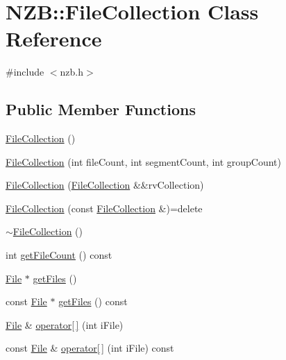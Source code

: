 \hypertarget{class_n_z_b_1_1_file_collection}{}\section{N\+ZB\+:\+:File\+Collection Class Reference}
\label{class_n_z_b_1_1_file_collection}


{\ttfamily \#include $<$nzb.\+h$>$}

\subsection*{Public Member Functions}
\begin{DoxyCompactItemize}
\item 
\hyperlink{class_n_z_b_1_1_file_collection_a2ae200e24e6a4ee4d1be8e649f72aba9}{File\+Collection} ()
\item 
\hyperlink{class_n_z_b_1_1_file_collection_a76662806b20ecb79fb1c4800df2ee9df}{File\+Collection} (int file\+Count, int segment\+Count, int group\+Count)
\item 
\hyperlink{class_n_z_b_1_1_file_collection_ab14971382a51c26233307404bacfa8e6}{File\+Collection} (\hyperlink{class_n_z_b_1_1_file_collection}{File\+Collection} \&\&rv\+Collection)
\item 
\hyperlink{class_n_z_b_1_1_file_collection_a1eeded48503a89ccc75e7446df3f7e3f}{File\+Collection} (const \hyperlink{class_n_z_b_1_1_file_collection}{File\+Collection} \&)=delete
\item 
\hyperlink{class_n_z_b_1_1_file_collection_a6d6986c488c8124efea37ef187589b88}{$\sim$\+File\+Collection} ()
\item 
int \hyperlink{class_n_z_b_1_1_file_collection_a33c0008fc18310d0a89fd72c38586c9a}{get\+File\+Count} () const
\item 
\hyperlink{class_n_z_b_1_1_file}{File} $\ast$ \hyperlink{class_n_z_b_1_1_file_collection_a921a80a0f09e9bd067566e236e5c688a}{get\+Files} ()
\item 
const \hyperlink{class_n_z_b_1_1_file}{File} $\ast$ \hyperlink{class_n_z_b_1_1_file_collection_a8b13dca0410b84a05aaeabe7e819b8cd}{get\+Files} () const
\item 
\hyperlink{class_n_z_b_1_1_file}{File} \& \hyperlink{class_n_z_b_1_1_file_collection_a60d75d8e870b9360ff0f03596ffd3885}{operator\mbox{[}$\,$\mbox{]}} (int i\+File)
\item 
const \hyperlink{class_n_z_b_1_1_file}{File} \& \hyperlink{class_n_z_b_1_1_file_collection_a169b09f36849f6e0c842939ae61cc383}{operator\mbox{[}$\,$\mbox{]}} (int i\+File) const

\end{DoxyCompactItemize}
